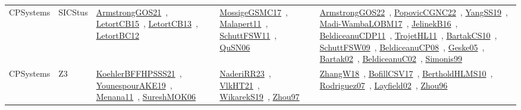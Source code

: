 {\begin{longtable}{lp{3cm}>{\raggedright\arraybackslash}p{6cm}>{\raggedright\arraybackslash}p{6cm}>{\raggedright\arraybackslash}p{8cm}}
CPSystems & SICStus & \href{works/ArmstrongGOS21.pdf}{ArmstrongGOS21}~\cite{ArmstrongGOS21}, \href{works/LetortCB15.pdf}{LetortCB15}~\cite{LetortCB15}, \href{works/LetortCB13.pdf}{LetortCB13}~\cite{LetortCB13}, \href{works/LetortBC12.pdf}{LetortBC12}~\cite{LetortBC12} & \href{works/MossigeGSMC17.pdf}{MossigeGSMC17}~\cite{MossigeGSMC17}, \href{works/Malapert11.pdf}{Malapert11}~\cite{Malapert11}, \href{works/SchuttFSW11.pdf}{SchuttFSW11}~\cite{SchuttFSW11}, \href{works/QuSN06.pdf}{QuSN06}~\cite{QuSN06} & \href{works/ArmstrongGOS22.pdf}{ArmstrongGOS22}~\cite{ArmstrongGOS22}, \href{works/PopovicCGNC22.pdf}{PopovicCGNC22}~\cite{PopovicCGNC22}, \href{works/YangSS19.pdf}{YangSS19}~\cite{YangSS19}, \href{works/Madi-WambaLOBM17.pdf}{Madi-WambaLOBM17}~\cite{Madi-WambaLOBM17}, \href{works/JelinekB16.pdf}{JelinekB16}~\cite{JelinekB16}, \href{works/BeldiceanuCDP11.pdf}{BeldiceanuCDP11}~\cite{BeldiceanuCDP11}, \href{works/TrojetHL11.pdf}{TrojetHL11}~\cite{TrojetHL11}, \href{works/BartakCS10.pdf}{BartakCS10}~\cite{BartakCS10}, \href{works/SchuttFSW09.pdf}{SchuttFSW09}~\cite{SchuttFSW09}, \href{works/BeldiceanuCP08.pdf}{BeldiceanuCP08}~\cite{BeldiceanuCP08}, \href{works/Geske05.pdf}{Geske05}~\cite{Geske05}, \href{works/Bartak02.pdf}{Bartak02}~\cite{Bartak02}, \href{works/BeldiceanuC02.pdf}{BeldiceanuC02}~\cite{BeldiceanuC02}, \href{works/Simonis99.pdf}{Simonis99}~\cite{Simonis99}\\
CPSystems & Z3 & \href{works/KoehlerBFFHPSSS21.pdf}{KoehlerBFFHPSSS21}~\cite{KoehlerBFFHPSSS21}, \href{works/YounespourAKE19.pdf}{YounespourAKE19}~\cite{YounespourAKE19}, \href{works/Menana11.pdf}{Menana11}~\cite{Menana11}, \href{works/SureshMOK06.pdf}{SureshMOK06}~\cite{SureshMOK06} & \href{works/NaderiRR23.pdf}{NaderiRR23}~\cite{NaderiRR23}, \href{works/VlkHT21.pdf}{VlkHT21}~\cite{VlkHT21}, \href{works/WikarekS19.pdf}{WikarekS19}~\cite{WikarekS19}, \href{works/Zhou97.pdf}{Zhou97}~\cite{Zhou97} & \href{works/ZhangW18.pdf}{ZhangW18}~\cite{ZhangW18}, \href{works/BofillCSV17.pdf}{BofillCSV17}~\cite{BofillCSV17}, \href{works/BertholdHLMS10.pdf}{BertholdHLMS10}~\cite{BertholdHLMS10}, \href{works/Rodriguez07.pdf}{Rodriguez07}~\cite{Rodriguez07}, \href{works/Layfield02.pdf}{Layfield02}~\cite{Layfield02}, \href{works/Zhou96.pdf}{Zhou96}~\cite{Zhou96}\\
\end{longtable}
}

